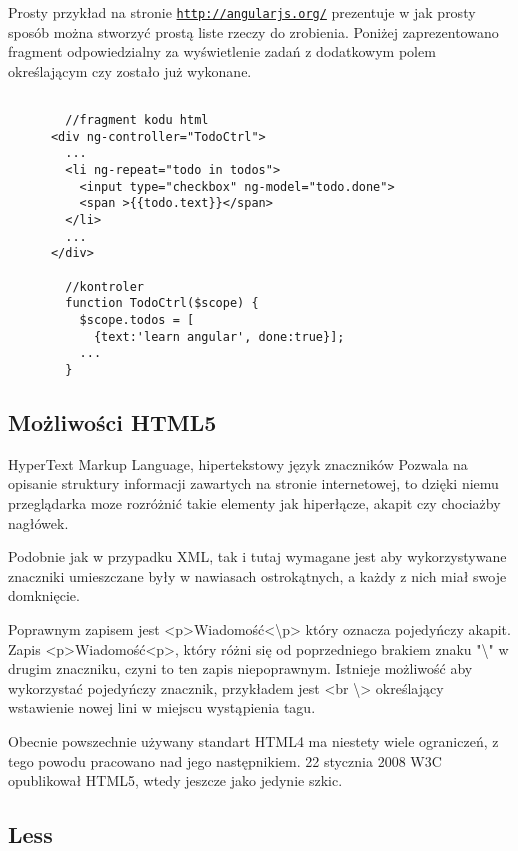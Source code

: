 Prosty przykład na stronie \underline{\texttt{http://angularjs.org/}} prezentuje w jak prosty sposób można stworzyć prostą liste rzeczy do zrobienia. Poniżej zaprezentowano fragment odpowiedzialny za wyświetlenie zadań z dodatkowym polem określającym czy zostało już wykonane.

\lstset{language=JavaScript}
\begin{lstlisting}[caption=AngularJs]

        //fragment kodu html
      <div ng-controller="TodoCtrl">
        ...
        <li ng-repeat="todo in todos">
          <input type="checkbox" ng-model="todo.done">
          <span >{{todo.text}}</span>
        </li>
        ...
      </div>

        //kontroler
        function TodoCtrl($scope) {
          $scope.todos = [
            {text:'learn angular', done:true}];
          ...
        }
\end{lstlisting}

\subsection{Możliwości HTML5}
\label{sec:html5}
\nocite{xml50}
\nocite{proxml}
\nocite{pre1}
\nocite{pre2}
\nocite{googlemapsbegin}
\nocite{proHTML5}
HyperText Markup Language,  hipertekstowy język znaczników
Pozwala na opisanie struktury informacji zawartych na stronie internetowej, to dzięki niemu przeglądarka moze rozróżnić takie elementy jak hiperłącze, akapit czy chociażby nagłówek.

Podobnie jak w przypadku XML, tak i tutaj wymagane jest aby wykorzystywane znaczniki umieszczane były w nawiasach ostrokątnych, a każdy z nich miał swoje domknięcie.

Poprawnym zapisem jest <p>Wiadomość<\textbackslash p> który oznacza pojedyńczy akapit. Zapis <p>Wiadomość<p>, który różni się od poprzedniego brakiem znaku "\textbackslash" w drugim znaczniku, czyni to ten zapis niepoprawnym. Istnieje możliwość aby wykorzystać pojedyńczy znacznik, przykładem jest <br \textbackslash> określający wstawienie nowej lini w miejscu wystąpienia tagu.

Obecnie powszechnie używany standart HTML4 ma niestety wiele ograniczeń, z tego powodu pracowano nad jego następnikiem. 22 stycznia 2008 W3C opublikował HTML5, wtedy jeszcze jako jedynie szkic.


\subsection{Less}
\label{sec:less}

